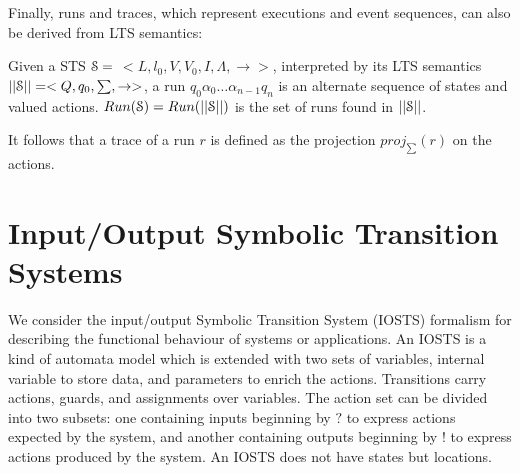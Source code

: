 Finally, runs and traces, which represent executions and event
sequences, can also be derived from LTS semantics:

\begin{definition}
    Given a STS $\EuScript{S}=$ $<L,l_0,V,V_0,I,\Lambda,
	\rightarrow>$, interpreted by its LTS semantics
	$||\EuScript{S}||=<Q,q_0,\sum,\rightarrow>$, a run $q_0
	\alpha_0 \dots \alpha_{n-1} q_n$ is an alternate sequence of states
    and valued actions. $Run(\EuScript{S})=Run(||\EuScript{S}||)$ is
	the set of runs found in $||\EuScript{S}||$.

    It follows that a trace of a run $r$ is defined as the projection
    $proj_{\sum}(r)$ on the actions.

	\label{def:Runs and traces}
\end{definition}


\section{Input/Output Symbolic Transition Systems}
\label{sec:definitions:iosts}

We consider the input/output Symbolic Transition System (IOSTS)
formalism \cite{FTW05} for describing the functional behaviour of
systems or applications. An IOSTS is a kind of automata model
which is extended with two sets of variables, internal variable
to store data, and parameters to enrich the actions. Transitions
carry actions, guards, and assignments over variables. The action
set can be divided into two subsets: one containing inputs
beginning by $?$ to express actions expected by the system, and
another containing outputs beginning by $!$ to express actions
produced by the system. An IOSTS does not have states but
locations.

